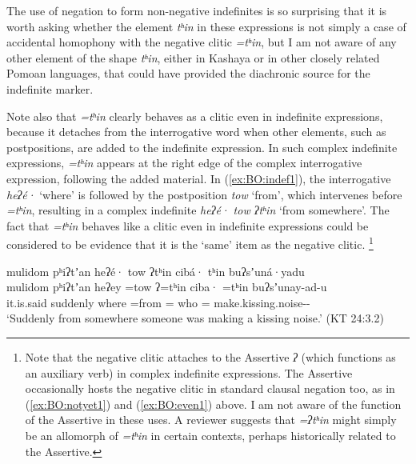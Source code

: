 \documentclass[output=paper,modfonts,nonflat,colorlinks,citecolor=brown]{langscibook}
\begin{document}

The use of negation to form non-negative indefinites is so surprising that it is worth asking whether the element \textit{tʰin} in these expressions is not simply a case of accidental homophony with the negative clitic \textit{=tʰin}, but I am not aware of any other element of the shape \textit{tʰin}, either in Kashaya or in other closely related Pomoan languages, that could have provided the diachronic source for the indefinite marker.

Note also that \textit{=tʰin} clearly behaves as a clitic even in indefinite expressions, because it detaches from the interrogative word when other elements, such as postpositions, are added to the indefinite expression.
In such complex indefinite expressions, \textit{=tʰin} appears at the right edge of the complex interrogative expression, following the added material. In (\ref{ex:BO:indef1}), the interrogative \textit{heʔé·} `where' is followed by the postposition \textit{tow} `from', which intervenes before \textit{=tʰin}, resulting in a complex indefinite \textit{heʔé· tow ʔtʰin} `from somewhere'. The fact that \textit{=tʰin} behaves like a clitic even in indefinite expressions could be considered to be evidence that it is the `same' item as the negative clitic.%
\footnote{%
Note that the negative clitic attaches to the Assertive \textit{ʔ} (which functions as an auxiliary verb) in complex indefinite expressions. The Assertive occasionally hosts the negative clitic in standard clausal negation too, as in (\ref{ex:BO:notyet1}) and (\ref{ex:BO:even1}) above. I am not aware of the function of the Assertive in these uses. A reviewer suggests that \textit{=ʔtʰin} might simply be an allomorph of \textit{=tʰin} in certain contexts, perhaps historically related to the Assertive.
} %

\ea 
\label{ex:BO:indef1}
\glll mulidom pʰiʔtʼan heʔé· tow ʔtʰin cibá· tʰin buʔsʼuná·yadu\\
 mulidom pʰiʔtʼan heʔey =tow ʔ=tʰin ciba· =tʰin buʔsʼunay-ad-u\\
 it.is.said suddenly where =from = who = make.kissing.noise--\\
\glt `Suddenly from somewhere someone was making a kissing noise.' ({KT 24:3.2})\\
\z
\end{document}
